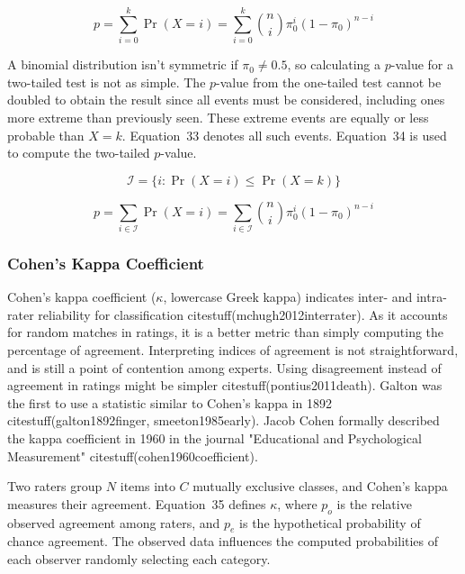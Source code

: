 \documentclass[preprint,12pt]{elsarticle}
\begin{document}
\begin{equation}
	p=\sum_{i=0}^{k}\Pr(X=i)=\sum_{i=0}^{k}{\binom{n}{i}}\pi_{0}^{i}(1-\pi_{0})^{n-i}
	\label{eqn:32}
\end{equation}

A binomial distribution isn't symmetric if $\pi_{0}\neq 0.5$, so calculating a $p$-value for a two-tailed test is not as simple. The $p$-value from the one-tailed test cannot be doubled to obtain the result since all events must be considered, including ones more extreme than previously seen. These extreme events are equally or less probable than $X=k$. Equation~33 denotes all such events. Equation~34 is used to compute the two-tailed $p$-value.

\begin{equation}
	{\mathcal{I}}=\{i\colon \Pr(X=i)\leq \Pr(X=k)\}
	\label{eqn:33}
\end{equation}

\begin{equation}
	p=\sum_{i\in {\mathcal{I}}}\Pr(X=i)=\sum_{i\in {\mathcal{I}}}{\binom{n}{i}}\pi_{0}^{i}(1-\pi_{0})^{n-i}
	\label{eqn:34}
\end{equation}

\subsubsection{Cohen's Kappa Coefficient}

Cohen's kappa coefficient ($\kappa$, lowercase Greek kappa) indicates inter- and intra-rater reliability for classification citestuff(mchugh2012interrater). As it accounts for random matches in ratings, it is a better metric than simply computing the percentage of agreement. Interpreting indices of agreement is not straightforward, and is still a point of contention among experts. Using disagreement instead of agreement in ratings might be simpler citestuff(pontius2011death). Galton was the first to use a statistic similar to Cohen's kappa in 1892 citestuff(galton1892finger, smeeton1985early). Jacob Cohen formally described the kappa coefficient in 1960 in the journal "Educational and Psychological Measurement" citestuff(cohen1960coefficient).

Two raters group $N$ items into $C$ mutually exclusive classes, and Cohen's kappa measures their agreement. Equation~35 defines $\kappa$, where $p_{o}$ is the relative observed agreement among raters, and $p_{e}$ is the hypothetical probability of chance agreement. The observed data influences the computed probabilities of each observer randomly selecting each category.
\end{document}
